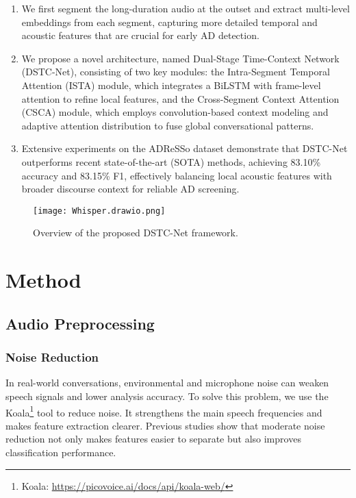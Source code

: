 \documentclass[journal]{IEEEtran}
\begin{document}
\begin{enumerate}[leftmargin=*]
  \item We first segment the long-duration audio at the outset and extract multi-level embeddings from each segment, capturing more detailed temporal and acoustic features that are crucial for early AD detection.
  \item We propose a novel architecture, named Dual-Stage Time-Context Network (DSTC-Net), consisting of two key modules: the Intra-Segment Temporal Attention (ISTA) module, which integrates a BiLSTM with frame-level attention to refine local features, and the Cross-Segment Context Attention (CSCA) module, which employs convolution-based context modeling and adaptive attention distribution to fuse global conversational patterns.
  \item Extensive experiments on the ADReSSo dataset demonstrate that DSTC-Net outperforms recent state-of-the-art (SOTA) methods, achieving 83.10\% accuracy and 83.15\% F1, effectively balancing local acoustic features with broader discourse context for reliable AD screening.
\end{enumerate}







\begin{figure*}[ht]
    \centering
    \texttt{[image: Whisper.drawio.png]}
    \caption{ Overview of the proposed DSTC-Net framework.}
    \label{fig:Whisper}
\end{figure*}




\section{Method}

\subsection{Audio Preprocessing}

\subsubsection{Noise Reduction}
In real-world conversations, environmental and microphone noise can weaken speech signals and lower analysis accuracy. To solve this problem, we use the Koala\footnote{Koala: \href{https://picovoice.ai/docs/api/koala-web/}{https://picovoice.ai/docs/api/koala-web/}} tool to reduce noise. 
It strengthens the main speech frequencies and makes feature extraction clearer. Previous studies \cite{2025-top-1} show that moderate noise reduction not only makes features easier to separate but also improves classification performance.
\end{document}
